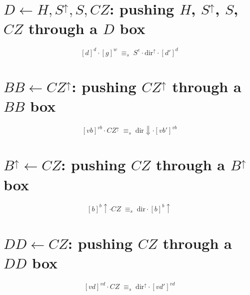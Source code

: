 \documentclass[a4paper]{article}
\begin{document}
\section*{$D \leftarrow H, S^\uparrow, S, CZ$: pushing $H$, $S^\uparrow$, $S$, $CZ$ through a $D$ box}
\[ [d]^d \cdot [g]^w \;\equiv_s\; S^e \cdot \mathrm{dir}^\uparrow \cdot [d']^d \]

\section*{$BB \leftarrow CZ^\uparrow$: pushing $CZ^\uparrow$ through a $BB$ box}
\[ [vb]^{vb} \cdot CZ^\uparrow \;\equiv_s\; \mathrm{dir}{\Downarrow} \cdot [vb']^{vb} \]

\section*{$B^\uparrow \leftarrow CZ$: pushing $CZ$ through a $B^\uparrow$ box}
\[ [b]^b{\uparrow} \cdot CZ \;\equiv_s\; \mathrm{dir} \cdot [b]^b{\uparrow} \]

\section*{$DD \leftarrow CZ$: pushing $CZ$ through a $DD$ box}
\[ [vd]^{vd} \cdot CZ \;\equiv_s\; \mathrm{dir}^\uparrow \cdot [vd']^{vd} \]
\end{document}
